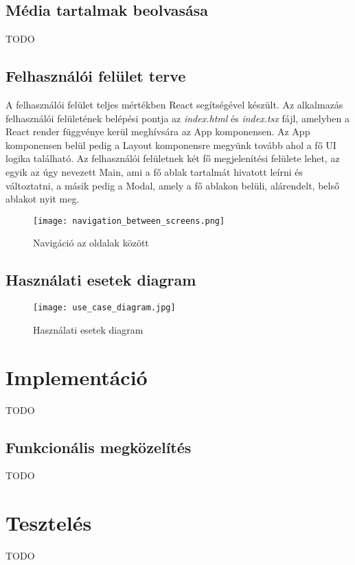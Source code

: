 \subsection{Média tartalmak beolvasása}
TODO

\subsection{Felhasználói felület terve}
A felhasználói felület teljes mértékben React segítségével készült. Az alkalmazás felhasználói felületének belépési pontja az {\it index.html} és {\it index.tsx} fájl, amelyben a React render függvénye kerül meghívsára az App komponensen. Az App komponensen belül pedig a Layout komponensre megyünk tovább ahol a fő UI logika található.
Az felhasználói felületnek két fő megjelenítési felülete lehet, az egyik az úgy nevezett Main, ami a fő ablak tartalmát hivatott leírni és változtatni, a másik pedig a Modal, amely a fő ablakon belüli, alárendelt, belső ablakot nyit meg.

\begin{figure}[H]
	\centering
	\texttt{[image: navigation\_between\_screens.png]}
	\caption{Navigáció az oldalak között}
	\label{fig:search}
\end{figure}

\subsection{Használati esetek diagram}
\begin{figure}[H]
	\centering
	\texttt{[image: use\_case\_diagram.jpg]}
	\caption{Használati esetek diagram}
	\label{fig:use_case}
\end{figure}

\section{Implementáció}
TODO

\subsection{Funkcionális megközelítés}
TODO

\section{Tesztelés}
TODO
